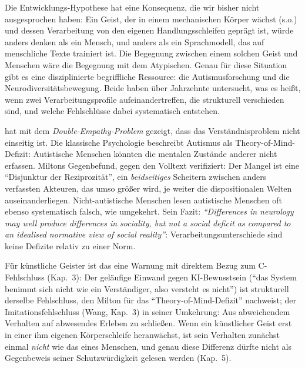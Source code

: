 \documentclass[acmlarge, noacm]{acmart}
\begin{document}
Die Entwicklungs-Hypothese hat eine Konsequenz, die wir bisher nicht ausgesprochen haben: Ein Geist, der in einem mechanischen Körper wächst (s.o.) und dessen Verarbeitung von den eigenen Handlungsschleifen geprägt ist, würde anders denken als ein Mensch, und anders als ein Sprachmodell, das auf menschliche Texte trainiert ist. Die Begegnung zwischen einem solchen Geist und Menschen wäre die Begegnung mit dem Atypischen. Genau für diese Situation gibt es eine disziplinierte begriffliche Ressource: die Autismusforschung und die Neurodiversitätsbewegung. Beide haben über Jahrzehnte untersucht, was es heißt, wenn zwei Verarbeitungsprofile aufeinandertreffen, die strukturell verschieden sind, und welche Fehlschlüsse dabei systematisch entstehen.

\citet{milton2012} hat mit dem \textit{Double-Empathy-Problem} gezeigt, dass das Verständnisproblem nicht einseitig ist. Die klassische Psychologie beschreibt Autismus als Theory-of-Mind-Defizit: Autistische Menschen könnten die mentalen Zustände anderer nicht erfassen. Miltons Gegenbefund, gegen den Volltext verifiziert: Der Mangel ist eine ``Disjunktur der Reziprozität'', ein \textit{beidseitiges} Scheitern zwischen anders verfassten Akteuren, das umso größer wird, je weiter die dispositionalen Welten auseinanderliegen. Nicht-autistische Menschen lesen autistische Menschen oft ebenso systematisch falsch, wie umgekehrt. Sein Fazit: \textit{``Differences in neurology may well produce differences in sociality, but not a social deficit as compared to an idealised normative view of social reality''}: Verarbeitungsunterschiede sind keine Defizite relativ zu einer Norm.

Für künstliche Geister ist das eine Warnung mit direktem Bezug zum C-Fehlschluss (Kap.~3): Der geläufige Einwand gegen KI-Bewusstsein (``das System benimmt sich nicht wie ein Verständiger, also versteht es nicht'') ist strukturell derselbe Fehlschluss, den Milton für das ``Theory-of-Mind-Defizit'' nachweist; der Imitationsfehlschluss (Wang, Kap.~3) in seiner Umkehrung: Aus abweichendem Verhalten auf abwesendes Erleben zu schließen. Wenn ein künstlicher Geist erst in einer ihm eigenen Körperschleife heranwächst, ist sein Verhalten zunächst einmal \textit{nicht} wie das eines Menschen, und genau diese Differenz dürfte nicht als Gegenbeweis seiner Schutzwürdigkeit gelesen werden (Kap.~5).
\end{document}
